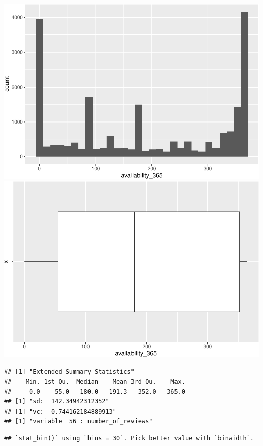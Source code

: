 \includegraphics{anal_files/figure-latex/unnamed-chunk-9-34.pdf}
\includegraphics{anal_files/figure-latex/unnamed-chunk-9-35.pdf}

\begin{verbatim}
## [1] "Extended Summary Statistics"
##    Min. 1st Qu.  Median    Mean 3rd Qu.    Max. 
##     0.0    55.0   180.0   191.3   352.0   365.0 
## [1] "sd:  142.34942312352"
## [1] "vc:  0.744162184889913"
## [1] "variable  56 : number_of_reviews"
\end{verbatim}

\begin{verbatim}
## `stat_bin()` using `bins = 30`. Pick better value with `binwidth`.
\end{verbatim}

